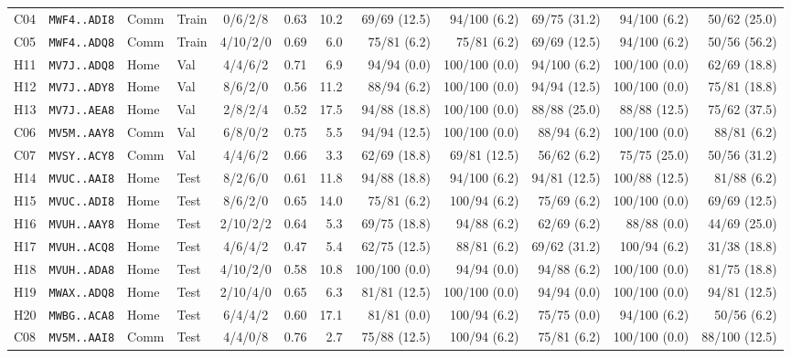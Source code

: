 \begin{tabular}{@{}llllcrrrrrrr@{}}
C04 & \texttt{MWF4..ADI8} & Comm & Train & 0/6/2/8 & 0.63 & 10.2 & 69/69 (12.5) & 94/100 (6.2) & 69/75 (31.2) & 94/100 (6.2) & 50/62 (25.0) \\
C05 & \texttt{MWF4..ADQ8} & Comm & Train & 4/10/2/0 & 0.69 & 6.0 & 75/81 (6.2) & 75/81 (6.2) & 69/69 (12.5) & 94/100 (6.2) & 50/56 (56.2) \\
\midrule
H11 & \texttt{MV7J..ADQ8} & Home & Val & 4/4/6/2 & 0.71 & 6.9 & 94/94 (0.0) & 100/100 (0.0) & 94/100 (6.2) & 100/100 (0.0) & 62/69 (18.8) \\
H12 & \texttt{MV7J..ADY8} & Home & Val & 8/6/2/0 & 0.56 & 11.2 & 88/94 (6.2) & 100/100 (0.0) & 94/94 (12.5) & 100/100 (0.0) & 75/81 (18.8) \\
H13 & \texttt{MV7J..AEA8} & Home & Val & 2/8/2/4 & 0.52 & 17.5 & 94/88 (18.8) & 100/100 (0.0) & 88/88 (25.0) & 88/88 (12.5) & 75/62 (37.5) \\
C06 & \texttt{MV5M..AAY8} & Comm & Val & 6/8/0/2 & 0.75 & 5.5 & 94/94 (12.5) & 100/100 (0.0) & 88/94 (6.2) & 100/100 (0.0) & 88/81 (6.2) \\
C07 & \texttt{MVSY..ACY8} & Comm & Val & 4/4/6/2 & 0.66 & 3.3 & 62/69 (18.8) & 69/81 (12.5) & 56/62 (6.2) & 75/75 (25.0) & 50/56 (31.2) \\
\midrule
H14 & \texttt{MVUC..AAI8} & Home & Test & 8/2/6/0 & 0.61 & 11.8 & 94/88 (18.8) & 94/100 (6.2) & 94/81 (12.5) & 100/88 (12.5) & 81/88 (6.2) \\
H15 & \texttt{MVUC..ADI8} & Home & Test & 8/6/2/0 & 0.65 & 14.0 & 75/81 (6.2) & 100/94 (6.2) & 75/69 (6.2) & 100/100 (0.0) & 69/69 (12.5) \\
H16 & \texttt{MVUH..AAY8} & Home & Test & 2/10/2/2 & 0.64 & 5.3 & 69/75 (18.8) & 94/88 (6.2) & 62/69 (6.2) & 88/88 (0.0) & 44/69 (25.0) \\
H17 & \texttt{MVUH..ACQ8} & Home & Test & 4/6/4/2 & 0.47 & 5.4 & 62/75 (12.5) & 88/81 (6.2) & 69/62 (31.2) & 100/94 (6.2) & 31/38 (18.8) \\
H18 & \texttt{MVUH..ADA8} & Home & Test & 4/10/2/0 & 0.58 & 10.8 & 100/100 (0.0) & 94/94 (0.0) & 94/88 (6.2) & 100/100 (0.0) & 81/75 (18.8) \\
H19 & \texttt{MWAX..ADQ8} & Home & Test & 2/10/4/0 & 0.65 & 6.3 & 81/81 (12.5) & 100/100 (0.0) & 94/94 (0.0) & 100/100 (0.0) & 94/81 (12.5) \\
H20 & \texttt{MWBG..ACA8} & Home & Test & 6/4/4/2 & 0.60 & 17.1 & 81/81 (0.0) & 100/94 (6.2) & 75/75 (0.0) & 94/100 (6.2) & 50/56 (6.2) \\
C08 & \texttt{MV5M..AAI8} & Comm & Test & 4/4/0/8 & 0.76 & 2.7 & 75/88 (12.5) & 100/94 (6.2) & 75/81 (6.2) & 100/100 (0.0) & 88/100 (12.5) \\

\end{tabular}
